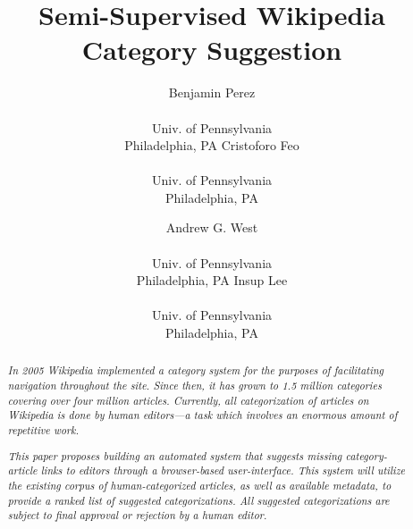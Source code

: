 \documentclass{sig-alternate}
\begin{document}
 

\title{Semi-Supervised Wikipedia Category Suggestion}
\subtitle{}
\author{
	\alignauthor Benjamin Perez \\  \\ Univ. of Pennsylvania \\ Philadelphia, PA
	\alignauthor Cristoforo Feo \\    \\ Univ. of Pennsylvania \\ Philadelphia, PA
\and
	\alignauthor Andrew G. West \\  \\ Univ. of Pennsylvania \\ Philadelphia, PA
	\alignauthor Insup Lee      \\      \\ Univ. of Pennsylvania \\ Philadelphia, PA
}
\date{}
\maketitle


\begin{abstract}
\textit{In 2005 Wikipedia implemented a category system for the purposes of facilitating navigation throughout the site. Since then, it has grown to 1.5 million categories covering over four million articles. Currently, all categorization of articles on Wikipedia is done by human editors---a task which involves an enormous amount of repetitive work.}

\textit{This paper proposes building an automated system that suggests missing category-article links to editors through a browser-based user-interface. This system will utilize the existing corpus of human-categorized articles, as well as available metadata, to provide a ranked list of suggested categorizations. All suggested categorizations are subject to final approval or rejection by a human editor.}
\end{abstract}
\end{document}
